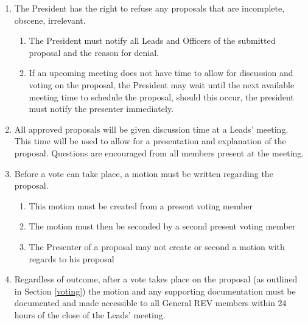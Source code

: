 \begin{enumerate}
\begin{enumerate}
    \end{enumerate}
\item The President has the right to refuse any proposals that are incomplete, obscene, irrelevant.
    \begin{enumerate}
    \item The President must notify all Leads and Officers of the submitted proposal and the reason for denial. 
    \item If an upcoming meeting does not have time to allow for discussion and voting on the proposal, the President may wait until the next available meeting time to schedule the proposal, should this occur, the president must notify the presenter immediately. 
    \end{enumerate}
\item All approved proposals will be given discussion time at a Leads’ meeting. This time will be used to allow for a presentation and explanation of the proposal. Questions are encouraged from all members present at the meeting.
\item Before a vote can take place, a motion must be written regarding the proposal. 
    \begin{enumerate}
    \item This motion must be created from a present voting member
    \item The motion must then be seconded by a second present voting member
    \item The Presenter of a proposal may not create or second a motion with regards to his proposal
    \end{enumerate}
\item Regardless of outcome, after a vote takes place on the proposal (as outlined in Section \ref{voting}) the motion and any supporting documentation must be documented and made accessible to all General REV members within 24 hours of the close of the Leads’ meeting. 
\end{enumerate}